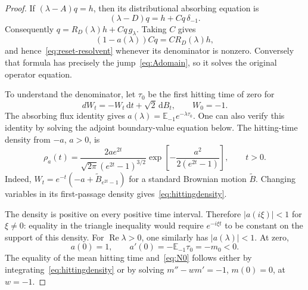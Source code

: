 \documentclass[11pt,a4paper]{article}
\numberwithin{equation}{section}
\theoremstyle{remark}\newtheorem{remark}[theorem]{Remark}
\newcommand{\dd}{\,\mathrm d}
\DeclareMathOperator{\Rea}{Re}
\begin{document}
\begin{proof}
If $(\lambda-A)q=h$, then its distributional absorbing equation is
\[
 (\lambda-D)q=h+Cq\,\delta_{-1}.
\]
Consequently $q=R_D(\lambda)h+Cq\,g_\lambda$. Taking $C$ gives
\[
 (1-a(\lambda))Cq=CR_D(\lambda)h,
\]
and hence~\eqref{eq:reset-resolvent} whenever its denominator is nonzero. Conversely that formula has precisely the jump~\eqref{eq:Adomain}, so it solves the original operator equation.

To understand the denominator, let $\tau_0$ be the first hitting time of zero for
\[
 dW_t=-W_t\dd t+\sqrt2\dd B_t,\qquad W_0=-1.
\]
The absorbing flux identity gives $a(\lambda)=\mathbb E_{-1}e^{-\lambda\tau_0}$. One can also verify this identity by solving the adjoint boundary-value equation below. The hitting-time density from $-a$, $a>0$, is
\begin{equation}\label{eq:hittingdensity}
 \rho_a(t)=\frac{2a e^{2t}}{\sqrt{2\pi}(e^{2t}-1)^{3/2}}
 \exp\left[-\frac{a^2}{2(e^{2t}-1)}\right],\qquad t>0.
\end{equation}
Indeed, $W_t=e^{-t}(-a+\widetilde B_{e^{2t}-1})$ for a standard Brownian motion $\widetilde B$. Changing variables in its first-passage density gives~\eqref{eq:hittingdensity}.

The density is positive on every positive time interval. Therefore $|a(i\xi)|<1$ for $\xi\ne0$: equality in the triangle inequality would require $e^{-i\xi t}$ to be constant on the support of this density. For $\Rea\lambda>0$, one similarly has $|a(\lambda)|<1$. At zero,
\[
 a(0)=1,\qquad a'(0)=-\mathbb E_{-1}\tau_0=-m_0<0.
\]
The equality of the mean hitting time and~\eqref{eq:N0} follows either by integrating~\eqref{eq:hittingdensity} or by solving $m''-wm'=-1$, $m(0)=0$, at $w=-1$.


\end{proof}
\end{document}
